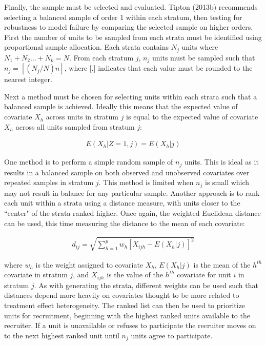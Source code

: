 \documentclass[man,floatsintext]{apa6}
\begin{document}
Finally, the sample must be selected and evaluated. Tipton (2013b) recommends selecting a balanced sample of order 1 within each stratum, then testing for robustness to model failure by comparing the selected sample on higher orders. First the number of units to be sampled from each strata must be identified using proportional sample allocation. Each strata contains \(N_j\) units where \(N_1 + N_2 ... + N_k = N\). From each stratum \(j\), \(n_j\) units must be sampled such that \(n_j = [(N_j/N)n]\), where {[}.{]} indicates that each value must be rounded to the nearest integer.

Next a method must be chosen for selecting units within each strata such that a balanced sample is achieved. Ideally this means that the expected value of covariate \(X_h\) across units in stratum \(j\) is equal to the expected value of covariate \(X_h\) across all units sampled from stratum \(j\):

\begin{align}
  E(X_h|Z = 1, j) = E(X_h|j)
\end{align}

One method is to perform a simple random sample of \(n_j\) units. This is ideal as it results in a balanced sample on both observed and unobserved covariates over repeated samples in stratum \(j\). This method is limited when \(n_j\) is small which may not result in balance for any particular sample. Another approach is to rank each unit within a strata using a distance measure, with units closer to the ``center" of the strata ranked higher. Once again, the weighted Euclidean distance can be used, this time measuring the distance to the mean of each covariate:

\begin{align} \label{eq:euclid}
  d_{ij} = \sqrt{\sum^p_{h=1}w_h[X_{ijh} - E(X_h|j)]^2}
\end{align}

where \(w_h\) is the weight assigned to covariate \(X_h\), \(E(X_h|j)\) is the mean of the \(h^{th}\) covariate in stratum \(j\), and \(X_{ijh}\) is the value of the \(h^{th}\) covariate for unit \(i\) in stratum \(j\). As with generating the strata, different weights can be used such that distances depend more heavily on covariates thought to be more related to treatment effect heterogeneity. The ranked list can then be used to prioritize units for recruitment, beginning with the highest ranked units available to the recruiter. If a unit is unavailable or refuses to participate the recruiter moves on to the next highest ranked unit until \(n_j\) units agree to participate.
\end{document}

